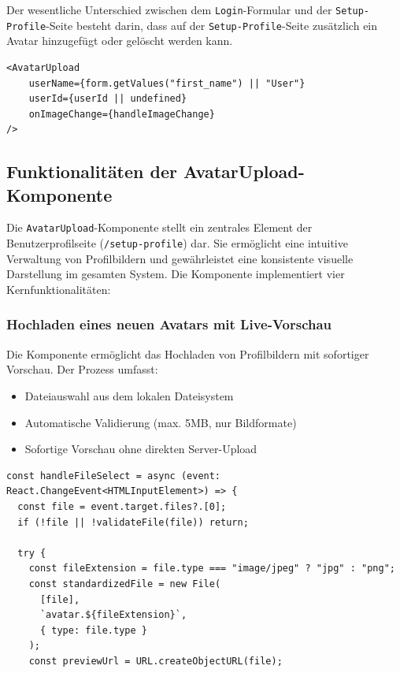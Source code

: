 \begin{inhalt}
Der wesentliche Unterschied zwischen dem \texttt{Login}-Formular und der \texttt{Setup-Profile}-Seite besteht darin, dass auf der \texttt{Setup-Profile}-Seite zusätzlich ein Avatar hinzugefügt oder gelöscht werden kann.

\begin{lstlisting}[style=mytsx]
<AvatarUpload
    userName={form.getValues("first_name") || "User"}
    userId={userId || undefined}
    onImageChange={handleImageChange}
/>
\end{lstlisting}

\subsection{Funktionalitäten der AvatarUpload-Komponente}

Die \texttt{AvatarUpload}-Komponente stellt ein zentrales Element der Benutzerprofilseite (\texttt{/setup-profile}) dar. Sie ermöglicht eine intuitive Verwaltung von Profilbildern und gewährleistet eine konsistente visuelle Darstellung im gesamten System. Die Komponente implementiert vier Kernfunktionalitäten:

\subsubsection{Hochladen eines neuen Avatars mit Live-Vorschau}
Die Komponente ermöglicht das Hochladen von Profilbildern mit sofortiger Vorschau. Der Prozess umfasst:
\begin{itemize}
    \item Dateiauswahl aus dem lokalen Dateisystem
    \item Automatische Validierung (max. 5MB, nur Bildformate)
    \item Sofortige Vorschau ohne direkten Server-Upload
\end{itemize}

\begin{lstlisting}[style=mytsx, caption={Implementierung des Avatar-Uploads mit Validierung}, label={lst:avatar_upload}]
const handleFileSelect = async (event: React.ChangeEvent<HTMLInputElement>) => {
  const file = event.target.files?.[0];
  if (!file || !validateFile(file)) return;

  try {
    const fileExtension = file.type === "image/jpeg" ? "jpg" : "png";
    const standardizedFile = new File(
      [file], 
      `avatar.${fileExtension}`, 
      { type: file.type }
    );
    const previewUrl = URL.createObjectURL(file);


\end{lstlisting}
\end{inhalt}
